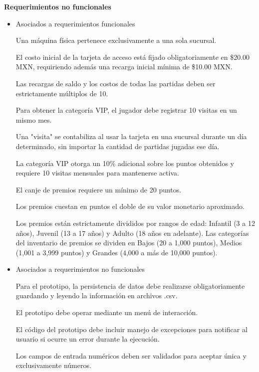 \item \textbf{Requerimientos no funcionales}

\begin{itemize}
        \item Asociados a requerimientos funcionales

Una máquina física pertenece exclusivamente a una sola sucursal.

El costo inicial de la tarjeta de acceso está fijado obligatoriamente en \$20.00 MXN, requiriendo además una recarga inicial mínima de \$10.00 MXN.

Las recargas de saldo y los costos de todas las partidas deben ser estrictamente múltiplos de 10.

Para obtener la categoría VIP, el jugador debe registrar 10 visitas en un mismo mes.

Una "visita" se contabiliza al usar la tarjeta en una sucursal durante un día determinado, sin importar la cantidad de partidas jugadas ese día.

La categoría VIP otorga un 10\% adicional sobre los puntos obtenidos y requiere 10 visitas mensuales para mantenerse activa.

El canje de premios requiere un mínimo de 20 puntos.

Los premios cuestan en puntos el doble de su valor monetario aproximado.

Los premios están estrictamente divididos por rangos de edad: Infantil (3 a 12 años), Juvenil (13 a 17 años) y Adulto (18 años en adelante).  
Las categorías del inventario de premios se dividen en Bajos (20 a 1,000 puntos), Medios (1,001 a 3,999 puntos) y Grandes (4,000 a más de 10,000 puntos).


        \item Asociados a requerimientos no funcionales

Para el prototipo, la persistencia de datos debe realizarse obligatoriamente guardando y leyendo la información en archivos .csv.

El prototipo debe operar mediante un menú de interacción.

El código del prototipo debe incluir manejo de excepciones para notificar al usuario si ocurre un error durante la ejecución.

Los campos de entrada numéricos deben ser validados para aceptar única y exclusivamente números.
\end{itemize}
